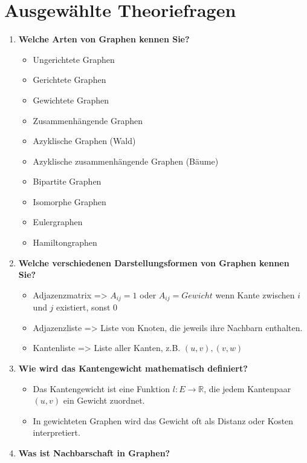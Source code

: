 \documentclass[12pt]{scrartcl}
\begin{document}
\section{Ausgewählte Theoriefragen}
\pagebreak

\begin{enumerate}
    \item \textbf{Welche Arten von Graphen kennen Sie?}
          \begin{itemize}
              \item Ungerichtete Graphen
              \item Gerichtete Graphen
              \item Gewichtete Graphen
              \item Zusammenhängende Graphen
              \item Azyklische Graphen (Wald)
              \item Azyklische zusammenhängende Graphen (Bäume)
              \item Bipartite Graphen
              \item Isomorphe Graphen
              \item Eulergraphen
              \item Hamiltongraphen
          \end{itemize}
    \item \textbf{Welche verschiedenen Darstellungsformen von Graphen kennen Sie?}
          \begin{itemize}
              \item Adjazenzmatrix => $A_{ij} = 1$ oder $A_{ij} = Gewicht$ wenn Kante zwischen $i$ und $j$ existiert, sonst $0$
              \item Adjazenzliste => Liste von Knoten, die jeweils ihre Nachbarn enthalten.
              \item Kantenliste => Liste aller Kanten, z.B. ${(u, v), (v, w)}$
          \end{itemize}
    \item \textbf{Wie wird das Kantengewicht mathematisch definiert?}
          \begin{itemize}
              \item Das Kantengewicht ist eine Funktion $l: E \to \mathbb{R}$, die jedem Kantenpaar $(u, v)$ ein Gewicht zuordnet.
              \item In gewichteten Graphen wird das Gewicht oft als Distanz oder Kosten interpretiert.
          \end{itemize}
    \item \textbf{Was ist Nachbarschaft in Graphen?}

\end{enumerate}
\end{document}
